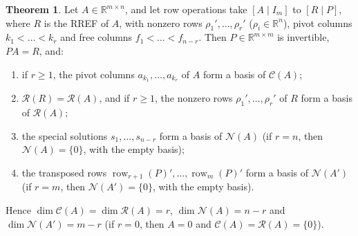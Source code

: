\documentclass[12pt]{article}
\newcommand{\R}{\mathbb R}
\DeclareMathOperator{\row}{row}
\theoremstyle{definition}
\newtheorem{theorem}{Theorem}
\begin{document}
\begin{theorem}\label{thm:r4-four-bases}
Let \(A\in\R^{m\times n}\), and let row operations take \([A\mid I_m]\) to \([R\mid P]\), where
\(R\) is the RREF of \(A\), with nonzero rows \(\rho_1',\dots,\rho_r'\) (\(\rho_i\in\R^n\)), pivot columns
\(k_1<\dots<k_r\) and free columns \(f_1<\dots<f_{n-r}\). Then \(P\in\R^{m\times m}\) is invertible,
\(PA=R\), and:
\begin{enumerate}
\item if \(r\geqslant1\), the pivot columns \(a_{k_1},\dots,a_{k_r}\) of \(A\) form a basis of
\(\mathcal C(A)\);
\item \(\mathcal R(R)=\mathcal R(A)\), and if \(r\geqslant1\), the nonzero rows \(\rho_1',\dots,\rho_r'\) of \(R\) form
a basis of \(\mathcal R(A)\);
\item the special solutions \(s_1,\dots,s_{n-r}\) form a basis of \(\mathcal N(A)\) (if \(r=n\),
then \(\mathcal N(A)=\{0\}\), with the empty basis);
\item the transposed rows \(\row_{r+1}(P)',\dots,\row_m(P)'\) form a basis of \(\mathcal N(A')\) (if
\(r=m\), then \(\mathcal N(A')=\{0\}\), with the empty basis).
\end{enumerate}
Hence \(\dim\mathcal C(A)=\dim\mathcal R(A)=r\), \(\dim\mathcal N(A)=n-r\) and
\(\dim\mathcal N(A')=m-r\) (if \(r=0\), then \(A=0\) and \(\mathcal C(A)=\mathcal R(A)=\{0\}\)).
\end{theorem}
\end{document}
